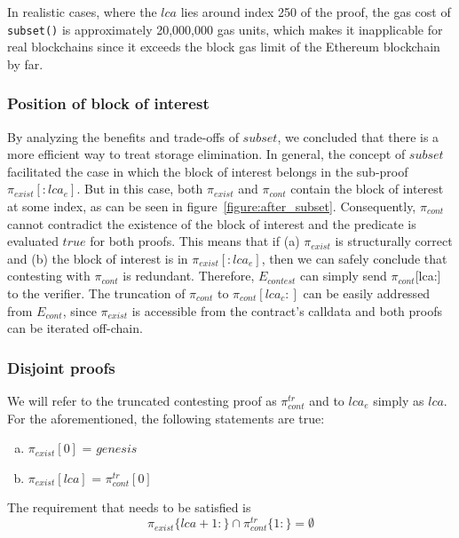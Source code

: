 In realistic cases, where the $lca$ lies around index 250 of the proof, the gas
cost of \texttt{subset()} is approximately 20,000,000 gas units, which makes it
inapplicable for real blockchains since it exceeds the block gas limit of
the Ethereum blockchain by far.

\subsubsection{Position of block of interest}

By analyzing the benefits and trade-offs of $subset$, we concluded that there
is a more efficient way to treat storage elimination. In general, the concept
of $subset$ facilitated the case in which the block of interest belongs in the
sub-proof $\pi_{exist}[:lca_{e}]$. But in this case, both $\pi_{exist}$ and
$\pi_{cont}$ contain the block of interest at some index, as can be seen in
figure~\ref{figure:after_subset}. Consequently, $\pi_{cont}$ cannot contradict
the existence of the block of interest and the predicate is evaluated $true$
for both proofs. This means that if (a) $\pi_{exist}$ is structurally correct
and (b) the block of interest is in $\pi_{exist}[:lca_{e}]$, then we can safely
conclude that contesting with $\pi_{cont}$ is redundant. Therefore,
$E_{contest}$ can simply send $\pi_{cont}$[lca:] to the verifier. The
truncation of $\pi_{cont}$ to $\pi_{cont}[lca_{c}:]$ can be easily addressed
from $E_{cont}$, since $\pi_{exist}$ is accessible from the contract's
calldata and both proofs can be iterated off-chain.

\newcommand*{\exist}{$\pi_{exist}$}
\newcommand*{\cont}{$\pi_{cont}^{tr}$}

\subsubsection{Disjoint proofs}

We will refer to the truncated contesting proof as $\pi_{cont}^{tr}$ and to
$lca_{e}$ simply as $lca$. For the aforementioned, the following statements are
true:

\begin{enumerate}[(a)]
    \item  $\pi_{exist}[0]$ = $genesis$
    \item  $\pi_{exist}[lca]$ = $\pi_{cont}^{tr}[0]$
\end{enumerate}

The requirement that needs to be satisfied is
\[\pi_{exist}\{lca+1:\} \cap \pi_{cont}^{tr}\{1:\} = \emptyset \]

